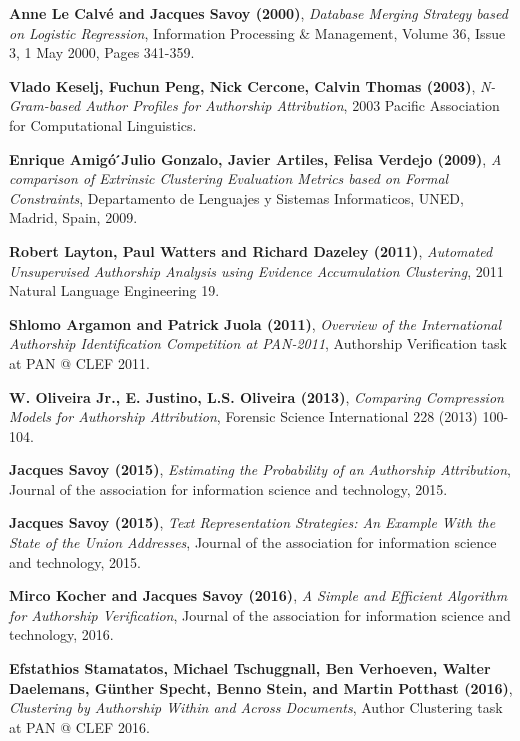 \begin{thebibliography}{9}

\textbf{Anne Le Calvé and Jacques Savoy (2000)},
\textit{Database Merging Strategy based on Logistic Regression},
Information Processing \& Management, Volume 36, Issue 3, 1 May 2000, Pages 341-359.

\textbf{Vlado Keselj, Fuchun Peng, Nick Cercone, Calvin Thomas (2003)},
\textit{N-Gram-based Author Profiles for Authorship Attribution},
2003 Pacific Association for Computational Linguistics.

\textbf{Enrique Amigó ́Julio Gonzalo, Javier Artiles, Felisa Verdejo (2009)},
\textit{A comparison of Extrinsic Clustering Evaluation Metrics based on Formal Constraints},
Departamento de Lenguajes y Sistemas Informaticos, UNED, Madrid, Spain, 2009.

\textbf{Robert Layton, Paul Watters and Richard Dazeley (2011)},
\textit{Automated Unsupervised Authorship Analysis using Evidence Accumulation Clustering},
2011 Natural Language Engineering 19.

\textbf{Shlomo Argamon and Patrick Juola (2011)},
\textit{Overview of the International Authorship Identification Competition at PAN-2011},
Authorship Verification task at PAN @ CLEF 2011.

\textbf{W. Oliveira Jr., E. Justino, L.S. Oliveira (2013)},
\textit{Comparing Compression Models for Authorship Attribution},
Forensic Science International 228 (2013) 100-104.

\textbf{Jacques Savoy (2015)},
\textit{Estimating the Probability of an Authorship Attribution},
Journal of the association for information science and technology, 2015.

\textbf{Jacques Savoy (2015)},
\textit{Text Representation Strategies: An Example With the State of the Union Addresses},
Journal of the association for information science and technology, 2015.

\textbf{Mirco Kocher and Jacques Savoy (2016)},
\textit{A Simple and Efficient Algorithm for Authorship Verification},
Journal of the association for information science and technology, 2016.

\textbf{Efstathios Stamatatos, Michael Tschuggnall, Ben Verhoeven, Walter Daelemans, Günther Specht, Benno Stein, and Martin Potthast (2016)},
\textit{Clustering by Authorship Within and Across Documents},
Author Clustering task at PAN @ CLEF 2016.


\end{thebibliography}
